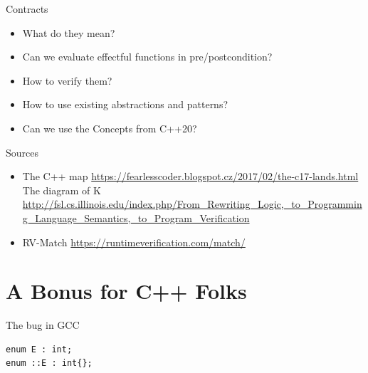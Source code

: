\documentclass[11pt]{beamer}
\newcommand{\backupbegin}{
   \newcounter{finalframe}
   \setcounter{finalframe}{\value{framenumber}}
}
\begin{document}
\begin{frame}{Contracts}
\begin{itemize}
\pause \item What do they mean?
\pause \item Can we evaluate effectful functions in pre/postcondition?
\pause \item How to verify them?
\pause \item How to use existing abstractions and patterns?
\pause \item Can we use the Concepts from C++20?
\end{itemize}
\end{frame}

\begin{frame}{Sources}
\begin{itemize}

\item The C++ map \url{https://fearlesscoder.blogspot.cz/2017/02/the-c17-lands.html}
The diagram of K \url{http://fsl.cs.illinois.edu/index.php/From\_Rewriting\_Logic,\_to\_Programming\_Language\_Semantics,\_to\_Program\_Verification} \\

\item RV-Match \url{https://runtimeverification.com/match/}


\end{itemize}
\end{frame}

\backupbegin

\section{A Bonus for C++ Folks}



\begin{frame}[fragile=singleslide]{The bug in GCC}
\begin{lstlisting}
enum E : int;
enum ::E : int{};
\end{lstlisting}
\end{frame}
\end{document}
